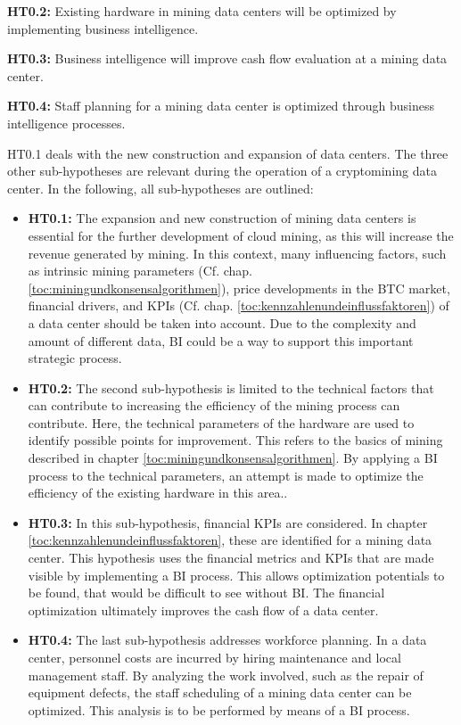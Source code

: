 \textbf{\ac{HT0.2}: }Existing hardware in mining data centers will be optimized by implementing business intelligence. 

\textbf{\ac{HT0.3}: }Business intelligence will improve cash flow evaluation at a mining data center. 

\textbf{\ac{HT0.4}: }Staff planning for a mining data center is optimized through business intelligence processes. 

\ac{HT0.1} deals with the new construction and expansion of data centers. The three other sub-hypotheses are relevant during the operation of a
cryptomining data center. In the following, all sub-hypotheses are outlined: 

\begin{itemize} 
    \item \textbf{\ac{HT0.1}: }The expansion and new construction of mining data centers is essential for the further development of cloud mining,
    as this will increase the revenue generated by mining. In this context, many influencing factors, such as intrinsic mining
    parameters (Cf. chap. \ref{toc:miningundkonsensalgorithmen}), price developments in the \ac{BTC} market, financial drivers, and \acp{KPI}
    (Cf. chap. \ref{toc:kennzahlenundeinflussfaktoren}) of a data center should be taken into account. Due to the complexity and amount of
    different data, \ac{BI} could be a way to support this important strategic process. 
    \item \textbf{\ac{HT0.2}: }The second sub-hypothesis is limited to the technical factors that can contribute to increasing the efficiency of the
    mining process can contribute. Here, the technical parameters of the hardware are used to identify possible points for improvement.
    This refers to the basics of mining described in chapter \ref{toc:miningundkonsensalgorithmen}.
    By applying a \ac{BI} process to the technical parameters, an attempt is made to optimize the efficiency of the existing hardware in this area..
    \item \textbf{\ac{HT0.3}: }In this sub-hypothesis, financial \acp{KPI} are considered. In chapter
    \ref{toc:kennzahlenundeinflussfaktoren}, these are identified for a mining data center. This hypothesis uses the financial
    metrics and \acp{KPI} that are made visible by implementing a \ac{BI} process. This allows optimization potentials to be
    found, that would be difficult to see without \ac{BI}. The financial optimization ultimately improves the cash flow of a
    data center. 
    \item \textbf{\ac{HT0.4}: }The last sub-hypothesis addresses workforce planning. In a data center, personnel costs are incurred by
    hiring maintenance and local management staff. By analyzing the work involved, such as the
    repair of equipment defects, the staff scheduling of a mining data center can be optimized. This analysis is to be performed by means of a
    \ac{BI} process.
\end{itemize}


